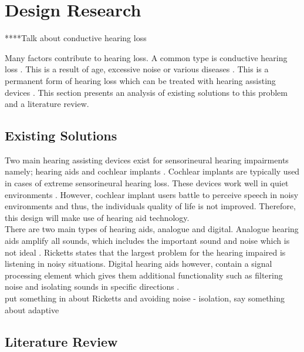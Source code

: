 \documentclass[12pt, onecolumn]{article}
\begin{document}
\section{Design Research}

****Talk about conductive hearing loss

\noindent Many factors contribute to hearing loss. A common type is conductive hearing loss \cite{earinfo}. This is a result of age, excessive noise or various diseases \cite{hearIt}. This is a permanent form of hearing loss which can be treated with hearing assisting devices \cite{hearIt}. This section presents an analysis of existing solutions to this problem and a literature review.

\subsection{Existing Solutions}

\noindent Two main hearing assisting devices exist for sensorineural hearing impairments namely; hearing aids and cochlear implants \cite{atlantic}. Cochlear implants are typically used in cases of extreme sensorineural hearing loss. These devices work well in quiet environments \cite{carroll}. However, cochlear implant users battle to perceive speech in noisy environments \cite{carroll} and thus, the individuals quality of life is not improved. Therefore, this design will make use of hearing aid technology.\\
\newline
\noindent There are two main types of hearing aids, analogue and digital. Analogue hearing aids amplify all sounds, which includes the important sound and noise which is not ideal \cite{woodford}. Ricketts \cite{ricketts} states that the largest problem for the hearing impaired is listening in noisy situations. Digital hearing aids however, contain a signal processing element which gives them additional functionality such as filtering noise and isolating sounds in specific directions \cite{ricketts}. \\

put something in about Ricketts and avoiding noise - isolation, say something about adaptive

\subsection{Literature Review}
\label{sec:litReview}
\end{document}
